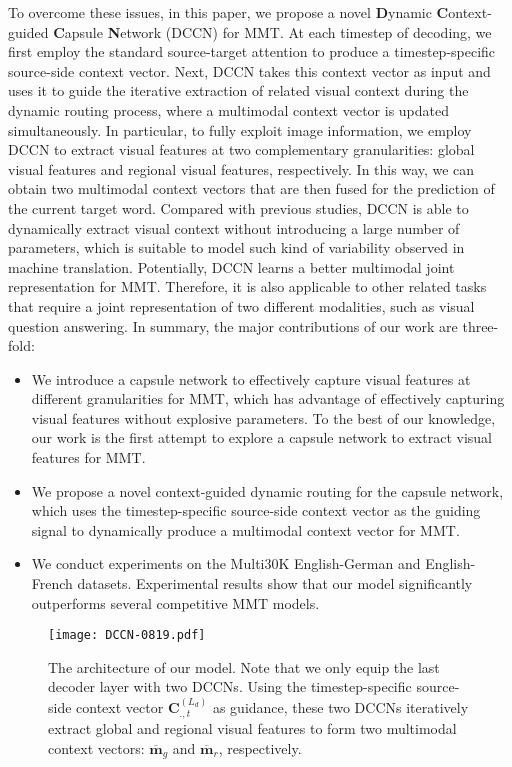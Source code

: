 \documentclass[sigconf]{acmart}
\begin{document}
To overcome these issues, in this paper, we propose a novel \textbf{D}ynamic \textbf{C}ontext-guided \textbf{C}apsule \textbf{N}etwork (DCCN) for MMT. 
At each timestep of decoding, 
we first employ the standard source-target attention to produce a timestep-specific source-side context vector. 
Next, 
DCCN takes this context vector as input and uses it to guide the iterative extraction of related visual context during the dynamic routing process, 
where a multimodal context vector is updated simultaneously. 
In particular, to fully exploit image information, we employ DCCN to extract visual features at  two complementary granularities: global visual features and regional visual features, respectively. 
In this way, we can obtain two multimodal context vectors that are then fused for the prediction of the current target word. Compared with previous studies, 
DCCN is able to dynamically extract visual context without introducing a large number of parameters, which is suitable to  model such kind of variability observed in machine translation. 
Potentially, DCCN learns a better multimodal joint representation for MMT. Therefore, it is also applicable to other related tasks that require a joint representation of two different modalities, such as visual question answering.
In summary, 
the major contributions of our work are three-fold: 
\begin{itemize}
\item 
We introduce a capsule network to effectively capture visual features at different granularities for MMT, 
which has advantage of effectively capturing visual features without explosive parameters. To the best of our knowledge, our work is the first attempt to explore a capsule network to extract visual features for MMT.

\item
We propose a novel context-guided dynamic routing for the capsule network,
which uses the timestep-specific source-side context vector as the guiding signal to dynamically produce a multimodal context vector for MMT. 

\item 
We conduct experiments on the Multi30K English-German and English-French datasets. Experimental results show that our model significantly outperforms several competitive MMT models.
\end{itemize}

\begin{figure*}[h]
\centering
\texttt{[image: DCCN-0819.pdf]} \caption{The architecture of our model. 
Note that we only equip the last decoder layer with two DCCNs. Using the timestep-specific source-side context vector $\textbf{C}^{(L_d)}_{.,t}$ as guidance, these two DCCNs iteratively extract global and regional visual features to form two multimodal context vectors: $\mathbf{\overline{m}}_{g}$ and $\mathbf{\overline{m}}_{r}$, respectively.
}
\label{fig1}
\end{figure*}
\end{document}
